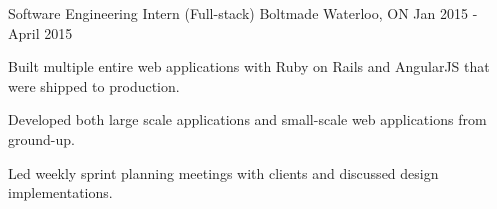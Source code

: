 \begin{cventries}
  \cventry
  {Software Engineering Intern (Full-stack)} %
    {Boltmade} %
    {Waterloo, ON} %
    {Jan 2015 - April 2015} %
    {
      \begin{cvitems} %
      \item {Built multiple entire web applications with Ruby on Rails and AngularJS that were shipped to production.}
      \item {Developed both large scale applications and small-scale web applications from ground-up.}
      \item {Led weekly sprint planning meetings with clients and discussed design implementations.}
  \end{cvitems} 
    }

\end{cventries}
